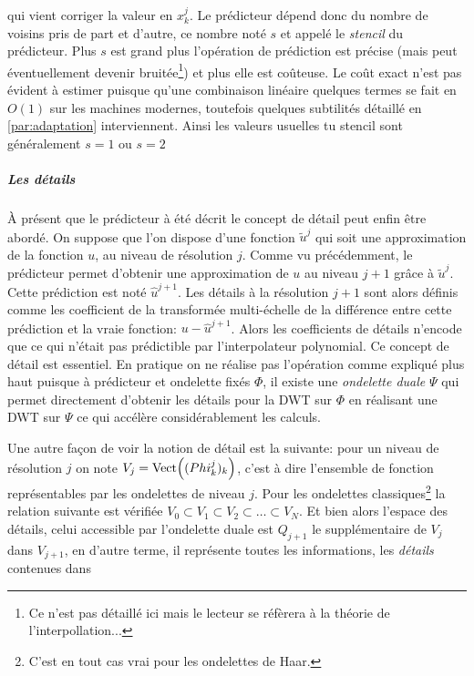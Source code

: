             qui vient corriger la valeur en $x_k^j$.
            Le prédicteur dépend donc du nombre de voisins pris de part et d'autre, ce nombre noté $s$ et appelé le \textit{stencil} du prédicteur.
            Plus $s$ est grand plus l'opération de prédiction est précise (mais peut éventuellement devenir bruitée\footnote{Ce n'est pas détaillé ici mais le lecteur se réfèrera à la théorie de l'interpollation...})
            et plus elle est coûteuse. Le coût exact n'est pas évident à estimer puisque qu'une combinaison linéaire
            quelques termes se fait en $O(1)$ sur les machines modernes, toutefois quelques subtilités détaillé en \ref{par:adaptation} interviennent.
            Ainsi les valeurs usuelles tu stencil sont généralement $s=1$ ou $s=2$

        \subparagraph{Les détails}
            À présent que le prédicteur à été décrit le concept de détail peut enfin être abordé. On suppose que l'on dispose d'une fonction $\tilde u^j$
            qui soit une approximation de la fonction $u$, au niveau de résolution $j$. Comme vu précédemment, le prédicteur permet d'obtenir une approximation 
            de $u$ au niveau $j+1$ grâce à $\tilde u^j$. Cette prédiction est noté $\hat u^{j+1}$. Les détails à la résolution $j+1$ sont alors définis comme les 
            coefficient de la transformée multi-échelle de la différence entre cette prédiction et la vraie fonction: $u-\hat u^{j+1}$.
            Alors les coefficients de détails n'encode que ce qui n'était pas prédictible par l'interpolateur polynomial. 
            Ce concept de détail est essentiel. 
            En pratique on ne réalise pas l'opération comme expliqué plus haut puisque à prédicteur et ondelette fixés $\Phi$, il existe une \textit{ondelette duale} $\Psi$
            qui permet directement d'obtenir les détails pour la DWT sur $\Phi$ en réalisant une DWT sur $\Psi$ ce qui accélère considérablement les calculs.\par
            Une autre façon de voir la notion de détail est la suivante:
            pour un niveau de résolution $j$ on note $V_j = \text{Vect}\Bigl((Phi_k^j)_k\Bigr)$, c'est à dire l'ensemble de fonction 
            représentables par les ondelettes de niveau $j$.
            Pour les ondelettes classiques\footnote{C'est en tout cas vrai pour les ondelettes de Haar\cite{postePoly}.} la relation suivante est vérifiée
            $V_0 \subset V_1 \subset V_2 \subset \ldots \subset V_N$. Et bien alors l'espace des détails, celui accessible par l'ondelette duale est $Q_{j+1}$
            le supplémentaire de $V_j$ dans $V_{j+1}$, en d'autre terme, il représente toutes les informations, les \textit{détails} contenues dans 
